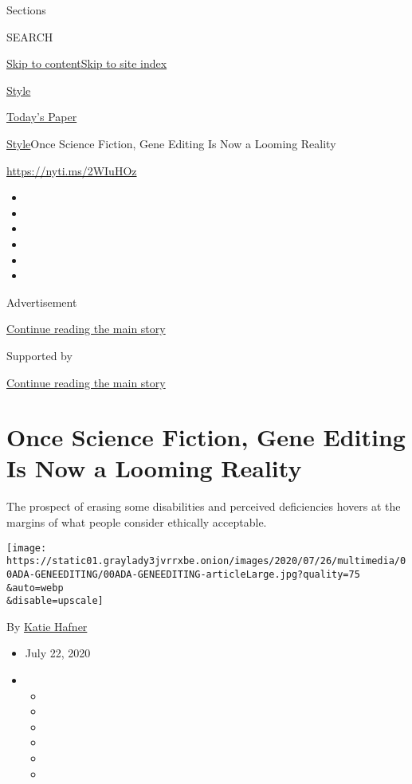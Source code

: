Sections

SEARCH

\protect\hyperlink{site-content}{Skip to
content}\protect\hyperlink{site-index}{Skip to site index}

\href{https://www.nytimes3xbfgragh.onion/section/style}{Style}

\href{https://myaccount.nytimes3xbfgragh.onion/auth/login?response_type=cookie\&client_id=vi}{}

\href{https://www.nytimes3xbfgragh.onion/section/todayspaper}{Today's
Paper}

\href{/section/style}{Style}\textbar{}Once Science Fiction, Gene Editing
Is Now a Looming Reality

\url{https://nyti.ms/2WIuHOz}

\begin{itemize}
\item
\item
\item
\item
\item
\item
\end{itemize}

Advertisement

\protect\hyperlink{after-top}{Continue reading the main story}

Supported by

\protect\hyperlink{after-sponsor}{Continue reading the main story}

\hypertarget{once-science-fiction-gene-editing-is-now-a-looming-reality}{%
\section{Once Science Fiction, Gene Editing Is Now a Looming
Reality}\label{once-science-fiction-gene-editing-is-now-a-looming-reality}}

The prospect of erasing some disabilities and perceived deficiencies
hovers at the margins of what people consider ethically acceptable.

\texttt{[image: https://static01.graylady3jvrrxbe.onion/images/2020/07/26/multimedia/00ADA-GENEEDITING/00ADA-GENEEDITING-articleLarge.jpg?quality=75\\\&auto=webp\\\&disable=upscale]}

By \href{https://www.nytimes3xbfgragh.onion/by/katie-hafner}{Katie
Hafner}

\begin{itemize}
\item
  July 22, 2020
\item
  \begin{itemize}
  \item
  \item
  \item
  \item
  \item
  \item
  \end{itemize}
\end{itemize}

